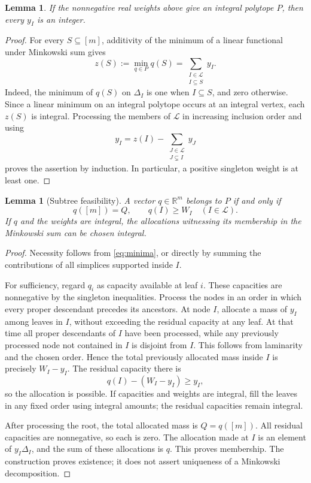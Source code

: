 \documentclass[11pt,letterpaper]{article}
\newtheorem{lemma}[theorem]{Lemma}
\theoremstyle{definition}
\theoremstyle{remark}
\newcommand{\RR}{\mathbb{R}}
\newcommand{\cL}{\mathcal{L}}
\begin{document}
\begin{lemma}\label{lem:integral}
If the nonnegative real weights above give an integral polytope $P$, then every $y_I$ is an integer.
\end{lemma}
\begin{proof}
For every $S\subseteq[m]$, additivity of the minimum of a linear functional under Minkowski sum gives
\begin{equation}\label{eq:minima}
 z(S):=\min_{q\in P}q(S)=\sum_{\substack{I\in\cL\\I\subseteq S}}y_I.
\end{equation}
Indeed, the minimum of $q(S)$ on $\Delta_I$ is one when $I\subseteq S$, and zero otherwise. Since a linear minimum on an integral polytope occurs at an integral vertex, each $z(S)$ is integral. Processing the members of $\cL$ in increasing inclusion order and using
\[
 y_I=z(I)-\sum_{\substack{J\in\cL\\J\subsetneq I}}y_J
\]
proves the assertion by induction. In particular, a positive singleton weight is at least one.
\end{proof}

\begin{lemma}[Subtree feasibility]\label{lem:feasible}
A vector $q\in\RR^m$ belongs to $P$ if and only if
\begin{equation}\label{eq:feasible}
 q([m])=Q,\qquad q(I)\geq W_I\quad(I\in\cL).
\end{equation}
If $q$ and the weights are integral, the allocations witnessing its membership in the Minkowski sum can be chosen integral.
\end{lemma}
\begin{proof}
Necessity follows from \eqref{eq:minima}, or directly by summing the contributions of all simplices supported inside $I$.

For sufficiency, regard $q_i$ as capacity available at leaf $i$. These capacities are nonnegative by the singleton inequalities. Process the nodes in an order in which every proper descendant precedes its ancestors. At node $I$, allocate a mass of $y_I$ among leaves in $I$, without exceeding the residual capacity at any leaf. At that time all proper descendants of $I$ have been processed, while any previously processed node not contained in $I$ is disjoint from $I$. This follows from laminarity and the chosen order. Hence the total previously allocated mass inside $I$ is precisely $W_I-y_I$. The residual capacity there is
\[
 q(I)-(W_I-y_I)\geq y_I,
\]
so the allocation is possible. If capacities and weights are integral, fill the leaves in any fixed order using integral amounts; the residual capacities remain integral.

After processing the root, the total allocated mass is $Q=q([m])$. All residual capacities are nonnegative, so each is zero. The allocation made at $I$ is an element of $y_I\Delta_I$, and the sum of these allocations is $q$. This proves membership. The construction proves existence; it does not assert uniqueness of a Minkowski decomposition.
\end{proof}
\end{document}

